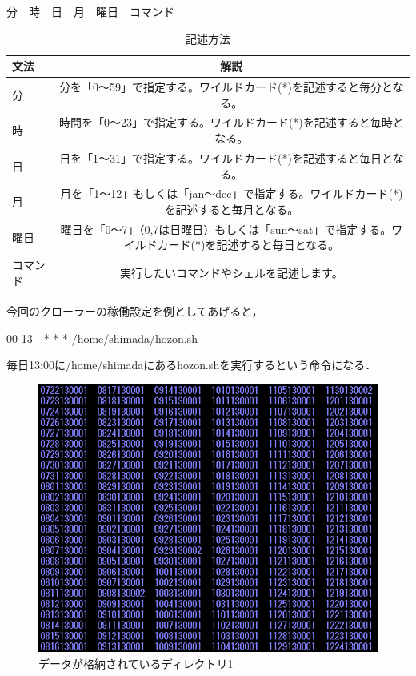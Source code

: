 分　時　日　月　曜日　コマンド

\begin{table}[H]
  \begin{center}
    \caption{記述方法}
    \begin{tabular}{|l|c|} \hline
      文法 & 解説  \\ \hline
分　& 分を「0～59」で指定する。ワイルドカード(*)を記述すると毎分となる。 \\
時 & 時間を「0～23」で指定する。ワイルドカード(*)を記述すると毎時となる。 \\
日 & 日を「1～31」で指定する。ワイルドカード(*)を記述すると毎日となる。 \\
月 & 月を「1～12」もしくは「jan～dec」で指定する。ワイルドカード(*)を記述すると毎月となる。 \\
曜日 & 曜日を「0～7」（0,7は日曜日）もしくは「sun～sat」で指定する。ワイルドカード(*)を記述すると毎日となる。 \\
コマンド & 実行したいコマンドやシェルを記述します。 \\ \hline
    \end{tabular}
  \end{center}
\end{table}

今回のクローラーの稼働設定を例としてあげると，

00 13　* * * /home/shimada/hozon.sh   

毎日13:00に/home/shimadaにあるhozon.shを実行するという命令になる．

\newpage

\begin{figure}[H]
\centering
\includegraphics[width=12cm]{hozon3.PNG}
\caption{データが格納されているディレクトリ1}\label{サンプル図}
\end{figure}

